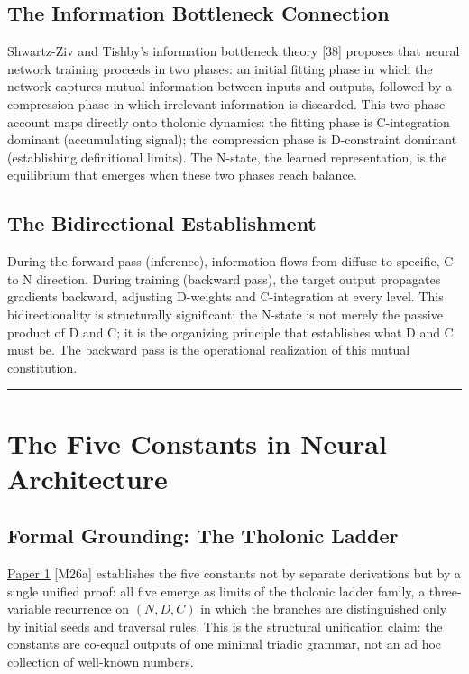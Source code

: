 \documentclass[12pt]{article}
\begin{document}
\subsection{The Information Bottleneck Connection}\label{the-information-bottleneck-connection}

Shwartz-Ziv and Tishby's information bottleneck theory {[}38{]} proposes
that neural network training proceeds in two phases: an initial fitting
phase in which the network captures mutual information between inputs
and outputs, followed by a compression phase in which irrelevant
information is discarded. This two-phase account maps directly onto
tholonic dynamics: the fitting phase is C-integration dominant
(accumulating signal); the compression phase is D-constraint dominant
(establishing definitional limits). The N-state, the learned
representation, is the equilibrium that emerges when these two phases
reach balance.

\subsection{The Bidirectional Establishment}\label{the-bidirectional-establishment}

During the forward pass (inference), information flows from diffuse to
specific, C to N direction. During training (backward pass), the target
output propagates gradients backward, adjusting D-weights and
C-integration at every level. This bidirectionality is structurally
significant: the N-state is not merely the passive product of D and C;
it is the organizing principle that establishes what D and C must be.
The backward pass is the operational realization of this mutual
constitution.

\begin{center}\rule{0.5\linewidth}{0.5pt}\end{center}

\section{The Five Constants in Neural Architecture}\label{the-five-constants-in-neural-architecture}

\subsection{Formal Grounding: The Tholonic Ladder}\label{formal-grounding-the-tholonic-ladder}

\href{https://github.com/baardev/truevalue/blob/main/docnav/Research/papers/1_recursive-tholonic-five-constants/1_recursive-tholonic-five-constants.pdf}{Paper
1} {[}M26a{]} establishes the five constants not by separate derivations
but by a single unified proof: all five emerge as limits of the tholonic
ladder family, a three-variable recurrence on \((N, D, C)\) in which the
branches are distinguished only by initial seeds and traversal rules.
This is the structural unification claim: the constants are co-equal
outputs of one minimal triadic grammar, not an ad hoc collection of
well-known numbers.
\end{document}
